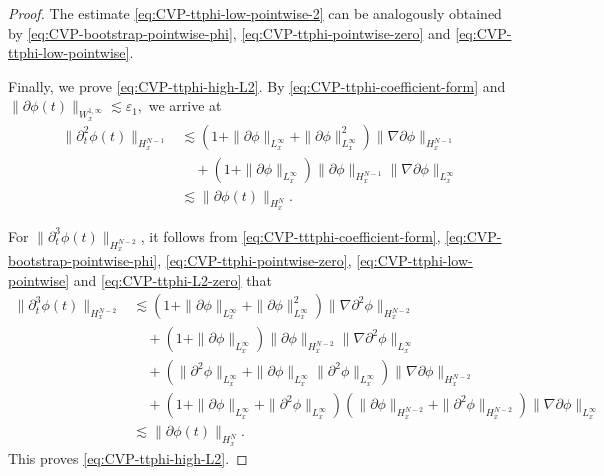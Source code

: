 \documentclass[11pt,twoside]{article}
\def\p{\partial}
\def\ve{\varepsilon}
\def\ls{\lesssim}
\theoremstyle{plain}
\theoremstyle{definition}
\theoremstyle{assumption}
\numberwithin{equation}{section}
\begin{document}
\begin{proof}
		The estimate \eqref{eq:CVP-ttphi-low-pointwise-2} can be analogously obtained by \eqref{eq:CVP-bootstrap-pointwise-phi}, \eqref{eq:CVP-ttphi-pointwise-zero} and \eqref{eq:CVP-ttphi-low-pointwise}.
		
		Finally, we prove \eqref{eq:CVP-ttphi-high-L2}.
		By \eqref{eq:CVP-ttphi-coefficient-form} and
		$\|\p\phi(t)\|_{W^{1,\infty}_x}\ls\ve_1,$
		we arrive at
		\begin{equation}
			\label{eq:CVP-ttphi-L2-zero}
			\begin{aligned}
				\|\p_t^2\phi(t)\|_{H^{N-1}_x}
				&\ls
				(1+\|\p\phi\|_{L^\infty_x}+\|\p\phi\|_{L^\infty_x}^2)\|\nabla\p\phi\|_{H^{N-1}_x}
				\\
				&\quad+(1+\|\p\phi\|_{L^\infty_x})\|\p\phi\|_{H^{N-1}_x}\|\nabla\p\phi\|_{L^\infty_x}
				\\
				&\ls
				\|\p\phi(t)\|_{H^N_x}.
			\end{aligned}
		\end{equation}
		
		For $\|\p_t^3\phi(t)\|_{H^{N-2}_x}$,
		it follows from
		\eqref{eq:CVP-tttphi-coefficient-form}, \eqref{eq:CVP-bootstrap-pointwise-phi},
		\eqref{eq:CVP-ttphi-pointwise-zero},
		\eqref{eq:CVP-ttphi-low-pointwise} and \eqref{eq:CVP-ttphi-L2-zero} that
		\begin{equation}
			\label{eq:CVP-tttphi-L2}
			\begin{aligned}
				\|\p_t^3\phi(t)\|_{H^{N-2}_x}
				&\ls
				(1+\|\p\phi\|_{L^\infty_x}+\|\p\phi\|_{L^\infty_x}^2)\|\nabla\p^2\phi\|_{H^{N-2}_x}
				\\
				&\quad+(1+\|\p\phi\|_{L^\infty_x})\|\p\phi\|_{H^{N-2}_x}\|\nabla\p^2\phi\|_{L^\infty_x}
				\\
				&\quad+(\|\p^2\phi\|_{L^\infty_x}+\|\p\phi\|_{L^\infty_x}\|\p^2\phi\|_{L^\infty_x})\|\nabla\p\phi\|_{H^{N-2}_x}
				\\
				&\quad+(1+\|\p\phi\|_{L^\infty_x}+\|\p^2\phi\|_{L^\infty_x})(\|\p\phi\|_{H^{N-2}_x}+\|\p^2\phi\|_{H^{N-2}_x})\|\nabla\p\phi\|_{L^\infty_x}
				\\
				&\ls
				\|\p\phi(t)\|_{H^N_x}.
			\end{aligned}
		\end{equation}
		This proves
		\eqref{eq:CVP-ttphi-high-L2}.
	\end{proof}
	
	
	
\end{document}
